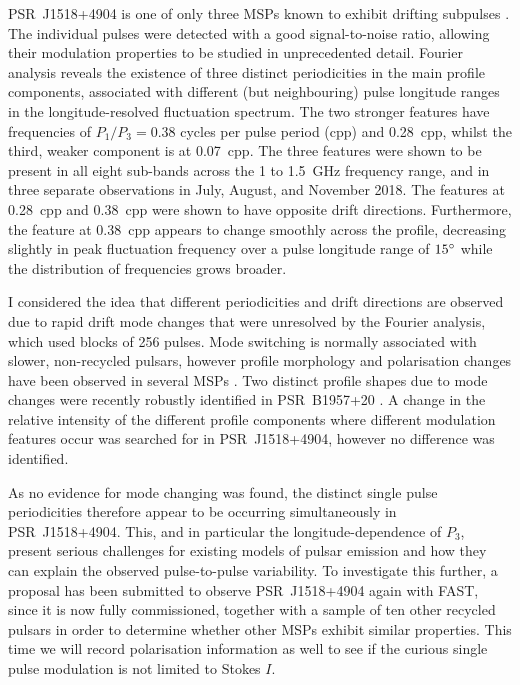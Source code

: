 PSR~J1518+4904 is one of only three MSPs known to exhibit drifting subpulses \citep{ESxx2003, LBJ+2016}. The individual pulses were detected with a good signal-to-noise ratio, allowing their modulation properties to be studied in unprecedented detail. Fourier analysis reveals the existence of three distinct periodicities in the main profile components, associated with different (but neighbouring) pulse longitude ranges in the longitude-resolved fluctuation spectrum. The two stronger features have frequencies of $P_1/P_3 = 0.38$ cycles per pulse period (cpp) and 0.28~cpp, whilst the third, weaker component is at 0.07~cpp. The three features were shown to be present in all eight sub-bands across the 1 to 1.5~GHz frequency range, and in three separate observations in July, August, and November 2018. The features at 0.28~cpp and 0.38~cpp were shown to have opposite drift directions. Furthermore, the feature at 0.38~cpp appears to change smoothly across the profile, decreasing slightly in peak fluctuation frequency over a pulse longitude range of $15^\circ$ while the distribution of frequencies grows broader.

I considered the idea that different periodicities and drift directions are observed due to rapid drift mode changes that were unresolved by the Fourier analysis, which used blocks of 256 pulses. Mode switching is normally associated with slower, non-recycled pulsars, however profile morphology and polarisation changes have been observed in several MSPs \citep{KXC+1999}. Two distinct profile shapes due to mode changes were recently robustly identified in PSR~B1957+20 \citep{MKMP2018}. A change in the relative intensity of the different profile components where different modulation features occur was searched for in PSR~J1518+4904, however no difference was identified.

As no evidence for mode changing was found, the distinct single pulse periodicities therefore appear to be occurring simultaneously in PSR~J1518+4904. This, and in particular the longitude-dependence of $P_3$, present serious challenges for existing models of pulsar emission and how they can explain the observed pulse-to-pulse variability. To investigate this further, a proposal has been submitted to observe PSR~J1518+4904 again with FAST, since it is now fully commissioned, together with a sample of ten other recycled pulsars in order to determine whether other MSPs exhibit similar properties. This time we will record polarisation information as well to see if the curious single pulse modulation is not limited to Stokes $I$.












